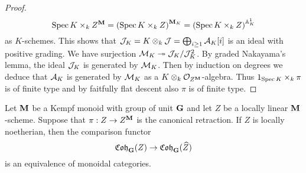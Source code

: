 \begin{proof}
$$\mathrm{Spec}\, K\times_k Z^{\mathbf{M}} = \left(\mathrm{Spec}\, K \times_k Z\right)^{\mathbf{M}_K} = \left(\mathrm{Spec}\, K \times_k Z\right)^{\mathbb{A}^1_K}$$
as $K$-schemes. This shows that ${\mathcal J}_K = K\otimes_k{\mathcal J} = \bigoplus_{i\geq 1} {\mathcal A}_K[i]$ is an ideal with positive grading. We have surjection ${\mathcal M}_K\twoheadrightarrow {\mathcal J}_K/{\mathcal J}_K^2$. By graded Nakayama's lemma, the ideal ${\mathcal J}_K$  is generated by ${\mathcal M}_K$. Then by induction on degrees we deduce that ${\mathcal A}_K$ is generated by ${\mathcal M}_K$ as a $K\otimes_k{\mathcal O}_{Z^{\mathbf{M}}}$-algebra. Thus $1_{\mathrm{Spec}\, K}\times_k\pi$ is of finite type and by faitfully flat descent also $\pi$ is of finite type.
\end{proof}

\begin{theorem}
Let $\mathbf{M}$ be a Kempf monoid with group of unit $\mathbf{G}$ and let $Z$ be a locally linear $\mathbf{M}$-scheme. Suppose that $\pi:Z\rightarrow Z^{\mathbf{M}}$ is the canonical retraction. If $Z$ is locally noetherian, then the comparison functor
$$\mathfrak{Coh}_{\mathbf{G}}(Z)\rightarrow \mathfrak{Coh}_{\mathbf{G}}(\widehat{Z})$$
is an equivalence of monoidal categories.
\end{theorem}
